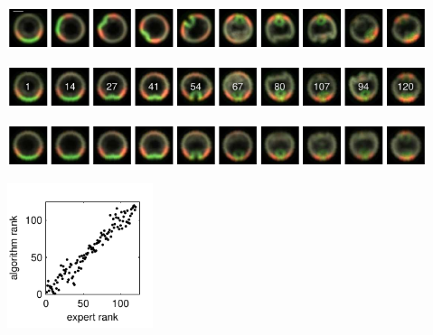 \documentclass[10pt]{article}
\begin{document}
\centering 

\noindent
\begin{minipage}[b]{12cm}
\includegraphics[width=12.25cm]{drosophila_fixed_images_scrambled}

\noindent
{}
\includegraphics[width=12.25cm]{drosophila_fixed_images_ordered}

\noindent
{}
\includegraphics[width=12.25cm]{drosophila_fixed_images_average}
\end{minipage}
%
\hfill
%
\includegraphics[width=4.25cm]{drosophila_fixed_images_rank_corr}
\end{document}
